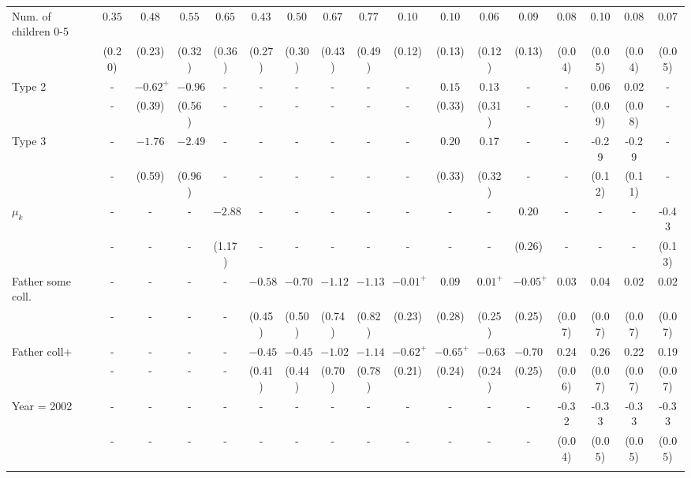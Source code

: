 \begin{tabular}{lcccccccccccccccc}
Num. of children 0-5&$0.35$&$0.48$&$0.55$&$0.65$&$0.43$&$0.50$&$0.67$&$0.77$&$0.10$&$0.10$&$0.06$&$0.09$&0.08&0.10&0.08&0.07\\
&(0.20)&(0.23)&(0.32)&(0.36)&(0.27)&(0.30)&(0.43)&(0.49)&(0.12)&(0.13)&(0.12)&(0.13)&(0.04)&(0.05)&(0.04)&(0.05)\\
Type 2&-&$-0.62^{+}$&$-0.96$&-&-&-&-&-&-&$0.15$&$0.13$&-&-&0.06&0.02&-\\
&-&(0.39)&(0.56)&-&-&-&-&-&-&(0.33)&(0.31)&-&-&(0.09)&(0.08)&-\\
Type 3&-&$-1.76$&$-2.49$&-&-&-&-&-&-&$0.20$&$0.17$&-&-&-0.29&-0.29&-\\
&-&(0.59)&(0.96)&-&-&-&-&-&-&(0.33)&(0.32)&-&-&(0.12)&(0.11)&-\\
$\mu_{k}$&-&-&-&$-2.88$&-&-&-&-&-&-&-&$0.20$&-&-&-&-0.43\\
&-&-&-&(1.17)&-&-&-&-&-&-&-&(0.26)&-&-&-&(0.13)\\
Father some coll.&-&-&-&-&$-0.58$&$-0.70$&$-1.12$&$-1.13$&$-0.01^{+}$&$0.09$&$0.01^{+}$&$-0.05^{+}$&0.03&0.04&0.02&0.02\\
&-&-&-&-&(0.45)&(0.50)&(0.74)&(0.82)&(0.23)&(0.28)&(0.25)&(0.25)&(0.07)&(0.07)&(0.07)&(0.07)\\
Father coll+&-&-&-&-&$-0.45$&$-0.45$&$-1.02$&$-1.14$&$-0.62^{+}$&$-0.65^{+}$&$-0.63$&$-0.70$&0.24&0.26&0.22&0.19\\
&-&-&-&-&(0.41)&(0.44)&(0.70)&(0.78)&(0.21)&(0.24)&(0.24)&(0.25)&(0.06)&(0.07)&(0.07)&(0.07)\\
Year = 2002&-&-&-&-&-&-&-&-&-&-&-&-&-0.32&-0.33&-0.33&-0.33\\
&-&-&-&-&-&-&-&-&-&-&-&-&(0.04)&(0.05)&(0.05)&(0.05)\\
\\
\bottomrule\end{tabular}